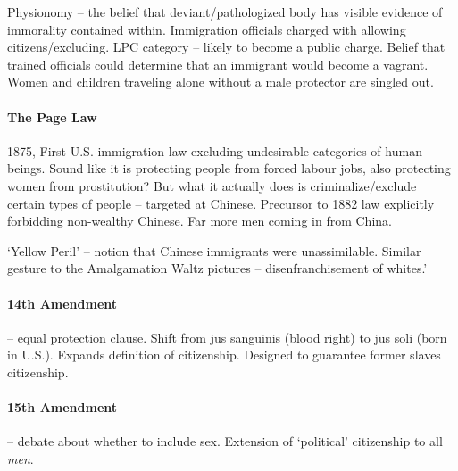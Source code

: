 Physionomy -- the belief that deviant/pathologized body has visible evidence of immorality contained within. Immigration officials charged with allowing citizens/excluding. LPC category -- likely to become a public charge. Belief that trained officials could determine that an immigrant would become a vagrant. Women and children traveling alone without a male protector are singled out.

\paragraph{The Page Law} 1875, First U.S. immigration law excluding undesirable categories of human beings. Sound like it is protecting people from forced labour jobs, also protecting women from prostitution? But what it actually does is criminalize/exclude certain types of people -- targeted at Chinese. Precursor to 1882 law explicitly forbidding non-wealthy Chinese. Far more men coming in from China.

`Yellow Peril' -- notion that Chinese immigrants were unassimilable. Similar gesture to the Amalgamation Waltz pictures -- disenfranchisement of whites.'

\paragraph{14th Amendment} -- equal protection clause. Shift from jus sanguinis (blood right) to jus soli (born in U.S.). Expands definition of citizenship. Designed to guarantee former slaves citizenship.

\paragraph{15th Amendment} -- debate about whether to include sex. Extension of `political' citizenship to all \textit{men}.